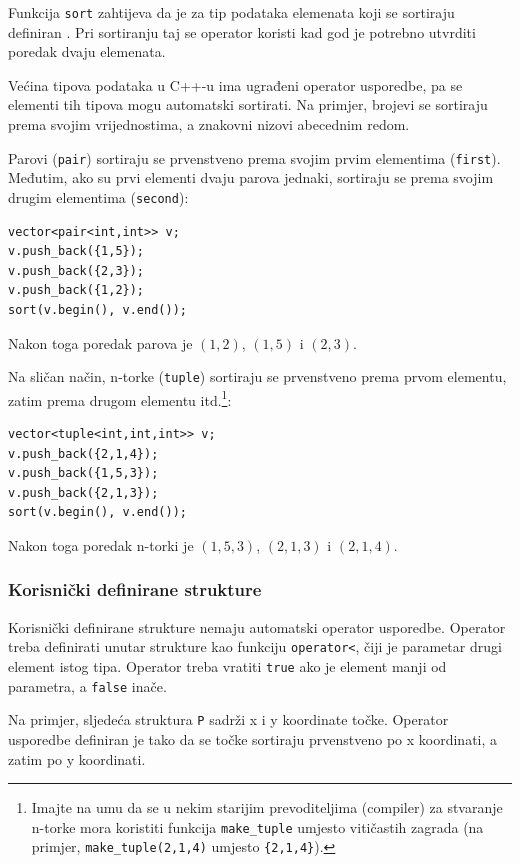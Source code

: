 Funkcija \texttt{sort} zahtijeva da je
za tip podataka elemenata koji se sortiraju
definiran .
Pri sortiranju taj se operator koristi
kad god je potrebno utvrditi poredak dvaju elemenata.

Većina tipova podataka u C++-u ima ugrađeni operator usporedbe,
pa se elementi tih tipova mogu automatski sortirati.
Na primjer, brojevi se sortiraju prema svojim vrijednostima,
a znakovni nizovi abecednim redom.


Parovi (\texttt{pair}) sortiraju se prvenstveno prema svojim
prvim elementima (\texttt{first}).
Međutim, ako su prvi elementi dvaju parova jednaki,
sortiraju se prema svojim drugim elementima (\texttt{second}):
\begin{lstlisting}
vector<pair<int,int>> v;
v.push_back({1,5});
v.push_back({2,3});
v.push_back({1,2});
sort(v.begin(), v.end());
\end{lstlisting}
Nakon toga poredak parova je
$(1,2)$, $(1,5)$ i $(2,3)$.


Na sličan način, n-torke (\texttt{tuple})
sortiraju se prvenstveno prema prvom elementu,
zatim prema drugom elementu itd.\footnote{Imajte na umu da se u nekim starijim prevoditeljima (compiler)
za stvaranje n-torke mora koristiti funkcija \texttt{make\_tuple} umjesto
vitičastih zagrada (na primjer, \texttt{make\_tuple(2,1,4)} umjesto \texttt{\{2,1,4\}}).}:
\begin{lstlisting}
vector<tuple<int,int,int>> v;
v.push_back({2,1,4});
v.push_back({1,5,3});
v.push_back({2,1,3});
sort(v.begin(), v.end());
\end{lstlisting}
Nakon toga poredak n-torki je
$(1,5,3)$, $(2,1,3)$ i $(2,1,4)$.

\subsubsection{Korisnički definirane strukture}

Korisnički definirane strukture nemaju automatski
operator usporedbe.
Operator treba definirati unutar
strukture kao funkciju
\texttt{operator<},
čiji je parametar drugi element istog tipa.
Operator treba vratiti \texttt{true}
ako je element manji od parametra,
a \texttt{false} inače.

Na primjer, sljedeća struktura \texttt{P}
sadrži x i y koordinate točke.
Operator usporedbe definiran je tako da se
točke sortiraju prvenstveno po x koordinati,
a zatim po y koordinati.

